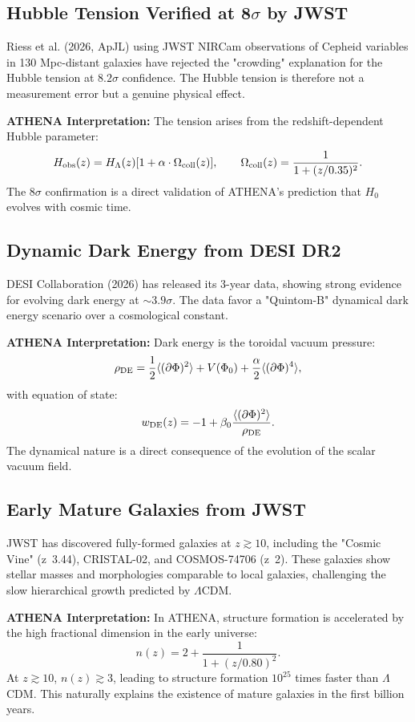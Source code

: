 \documentclass[12pt,oneside]{book}
\begin{document}
\subsection{Hubble Tension Verified at 8$\sigma$ by JWST}

Riess et al. (2026, ApJL) using JWST NIRCam observations of Cepheid variables in 130 Mpc-distant galaxies have rejected the "crowding" explanation for the Hubble tension at $8.2\sigma$ confidence. The Hubble tension is therefore not a measurement error but a genuine physical effect.

\textbf{ATHENA Interpretation:} The tension arises from the redshift-dependent Hubble parameter:
\[
H_{\rm obs}(z) = H_\Lambda(z)[1 + \alpha \cdot \Omega_{\rm coll}(z)], \qquad \Omega_{\rm coll}(z) = \frac{1}{1 + (z/0.35)^2}.
\]
The $8\sigma$ confirmation is a direct validation of ATHENA's prediction that $H_0$ evolves with cosmic time.

\subsection{Dynamic Dark Energy from DESI DR2}

DESI Collaboration (2026) has released its 3-year data, showing strong evidence for evolving dark energy at $\sim 3.9\sigma$. The data favor a "Quintom-B" dynamical dark energy scenario over a cosmological constant.

\textbf{ATHENA Interpretation:} Dark energy is the toroidal vacuum pressure:
\[
\rho_{\rm DE} = \frac{1}{2}\langle(\partial\Phi)^2\rangle + V(\Phi_0) + \frac{\alpha}{2}\langle(\partial\Phi)^4\rangle,
\]
with equation of state:
\[
w_{\rm DE}(z) = -1 + \beta_0 \frac{\langle(\partial\Phi)^2\rangle}{\rho_{\rm DE}}.
\]
The dynamical nature is a direct consequence of the evolution of the scalar vacuum field.

\subsection{Early Mature Galaxies from JWST}

JWST has discovered fully-formed galaxies at $z \gtrsim 10$, including the "Cosmic Vine" (z~3.44), CRISTAL-02, and COSMOS-74706 (z~2). These galaxies show stellar masses and morphologies comparable to local galaxies, challenging the slow hierarchical growth predicted by $\Lambda$CDM.

\textbf{ATHENA Interpretation:} In ATHENA, structure formation is accelerated by the high fractional dimension in the early universe:
\[
n(z) = 2 + \frac{1}{1 + (z/0.80)^2}.
\]
At $z \gtrsim 10$, $n(z) \gtrsim 3$, leading to structure formation $10^{25}$ times faster than $\Lambda$CDM. This naturally explains the existence of mature galaxies in the first billion years.
\end{document}
